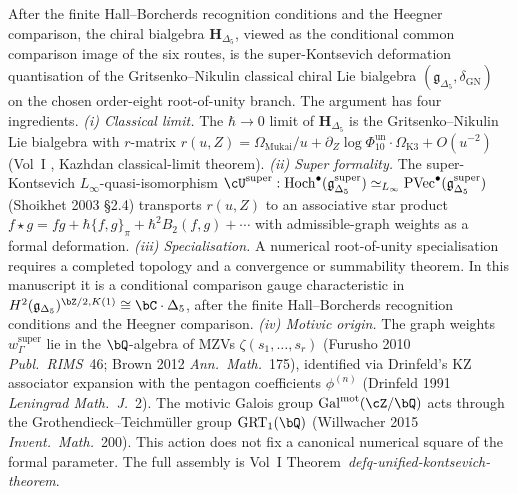 \begin{remark}
\label{rem:cy-c-six-routes-kontsevich-deformation}
After the finite Hall--Borcherds recognition conditions and the Heegner
comparison, the chiral bialgebra $\mathbf{H}_{\Delta_5}$, viewed as the
conditional common comparison image of the six routes, is the
super-Kontsevich deformation
quantisation of the Gritsenko--Nikulin classical chiral Lie bialgebra
$(\mathfrak{g}_{\Delta_5}, \delta_{\mathrm{GN}})$ on the chosen
order-eight root-of-unity branch. The argument has four ingredients.
\emph{(i) Classical
limit.} The $\hbar\to 0$ limit of $\mathbf{H}_{\Delta_5}$ is the
Gritsenko--Nikulin Lie bialgebra with $r$-matrix $r(u, Z) =
\Omega_{\mathrm{Mukai}}/u + \partial_Z\log\Phi_{10}^{\mathrm{un}}\cdot
\Omega_{\mathrm{K3}} + O(u^{-2})$ (Vol~I
\cite{VolI}, Kazhdan classical-limit
theorem). \emph{(ii) Super
formality.} The super-Kontsevich $L_\infty$-quasi-isomorphism
$\cU^{\mathrm{super}}: \mathrm{Hoch}^\bullet
(\mathfrak{g}_{\Delta_5}^{\mathrm{super}}) \simeq_{L_\infty}
\mathrm{PVec}^\bullet(\mathfrak{g}_{\Delta_5}^{\mathrm{super}})$
(Shoikhet 2003 \S2.4) transports $r(u, Z)$ to an associative star
product $f \star g = fg + \hbar\{f, g\}_\pi + \hbar^2 B_2(f, g) +
\cdots$ with admissible-graph weights as a formal deformation.
\emph{(iii) Specialisation.} A numerical root-of-unity specialisation
requires a completed topology and a convergence or summability theorem.
In this manuscript it is a conditional comparison gauge characteristic in
$H^2(\mathfrak{g}_{\Delta_5})^{\bZ/2, K(1)}
\cong\bC\cdot\Delta_5$, after the finite Hall--Borcherds recognition
conditions and the Heegner comparison. \emph{(iv) Motivic origin.} The graph weights
$w_\Gamma^{\mathrm{super}}$ lie in the $\bQ$-algebra of MZVs
$\zeta(s_1, \ldots, s_r)$ (Furusho 2010 \emph{Publ.\ RIMS}~46; Brown
2012 \emph{Ann.\ Math.}~175), identified via Drinfeld's KZ associator
expansion with the pentagon coefficients $\phi^{(n)}$ (Drinfeld 1991
\emph{Leningrad Math.\ J.}~2). The motivic Galois group
$\mathrm{Gal}^{\mathrm{mot}}(\cZ/\bQ)$ acts through the
Grothendieck--Teichm\"uller group $\mathrm{GRT}_1(\bQ)$
(Willwacher 2015 \emph{Invent.\ Math.}~200). This action does not fix
a canonical numerical square of the formal parameter. The full assembly
is Vol~I
\cite{VolI}
Theorem~\textit{defq-unified-kontsevich-theorem}.
\end{remark}

